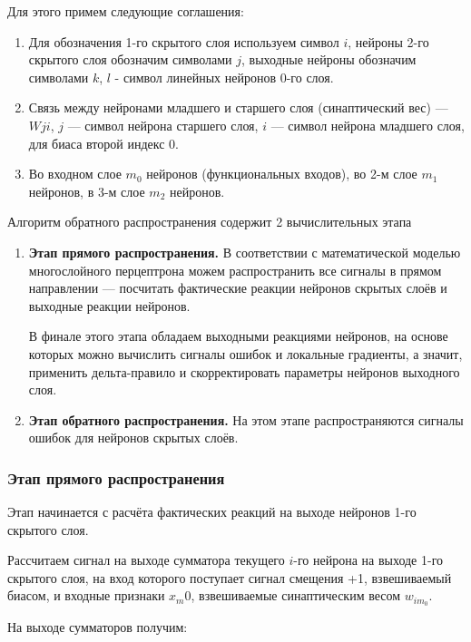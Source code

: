 \documentclass{article}
\numberwithin{equation}{subsection}
\begin{document}
Для этого примем следующие соглашения:
\begin{enumerate}
    \item Для обозначения 1-го скрытого слоя используем символ $i$, нейроны 2-го скрытого слоя 
    обозначим символами $j$, выходные нейроны обозначим символами $k$, $l$ - символ линейных 
    нейронов 0-го слоя.
    \item Связь между нейронами младшего и старшего слоя (синаптический вес) --- $W{ji}$, 
    $j$ --- символ нейрона старшего слоя, $i$ --- символ нейрона младшего слоя, 
    для биаса второй индекс $0$.
    \item Во входном слое $m_0$ нейронов (функциональных входов), во 2-м слое 
    $m_1$ нейронов, в 3-м слое $m_2$ нейронов.
\end{enumerate}

Алгоритм обратного распространения содержит 2 вычислительных этапа
\begin{enumerate}
    \item \textbf{Этап прямого распространения.} В соответствии с математической моделью многослойного 
    перцептрона можем распространить все сигналы в прямом направлении --- посчитать фактические 
    реакции нейронов скрытых слоёв и выходные реакции нейронов. 
    
    В финале этого этапа обладаем выходными реакциями нейронов, на основе которых можно 
    вычислить сигналы ошибок и локальные градиенты, а значит, применить дельта-правило 
    и скорректировать параметры нейронов выходного слоя.
    \item \textbf{Этап обратного распространения.} 
    На этом этапе распространяются сигналы ошибок для нейронов скрытых слоёв.
\end{enumerate}



\subsubsection{Этап прямого распространения}

Этап начинается с расчёта фактических реакций на выходе нейронов 1-го скрытого слоя. 

Рассчитаем сигнал на выходе сумматора текущего $i$-го нейрона на выходе 1-го скрытого слоя, 
на вход которого  поступает сигнал смещения \glqq +1\grqq, взвешиваемый биасом, и входные признаки 
$x_m0$, взвешиваемые синаптическим весом $w_{im_0}$.

На выходе сумматоров получим:
\end{document}
